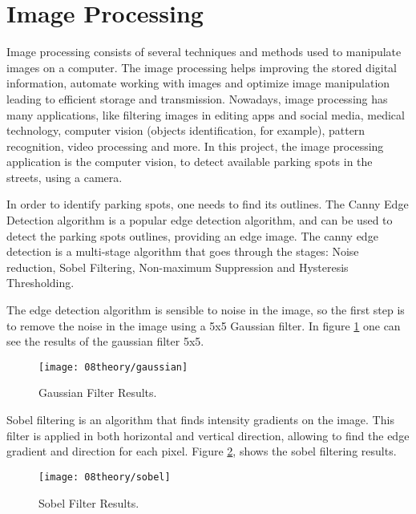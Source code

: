 \clearpage
\section{Image Processing}
\label{section:imageProc}
Image processing consists of several techniques and methods used to manipulate images on a computer. The image processing helps improving the stored digital information, automate working with images and optimize image manipulation leading to efficient storage and transmission. Nowadays, image processing has many applications, like filtering images in editing apps and social media, medical technology, computer vision (objects identification, for example), pattern recognition, video processing and more. In this project, the image processing application is the computer vision, to detect available parking spots in the streets, using a camera.

In order to identify parking spots, one needs to find its outlines. The Canny Edge Detection \cite{canny} algorithm is a popular edge detection algorithm, and can be used to detect the parking spots outlines, providing an edge image. The canny edge detection is a multi-stage algorithm that goes through the stages: Noise reduction, Sobel Filtering, Non-maximum Suppression and Hysteresis Thresholding.


The edge detection algorithm is sensible to noise in the image, so the first step is to remove the noise in the image using a 5x5 Gaussian filter. In figure \ref{fig:gaussian} one can see the results of the gaussian filter 5x5. 

\begin{figure}[H]
	\centering
	\texttt{[image: 08theory/gaussian]}
	\caption{Gaussian Filter Results.}
	\label{fig:gaussian}
\end{figure}


Sobel filtering is an algorithm that finds intensity gradients on the image. This filter is applied in both horizontal and vertical direction, allowing to find the edge gradient and direction for each pixel. Figure \ref{fig:sobel}, shows the sobel filtering results.

\begin{figure}[H]
	\centering
	\texttt{[image: 08theory/sobel]}
	\caption{Sobel Filter Results.}
	\label{fig:sobel}
\end{figure}

